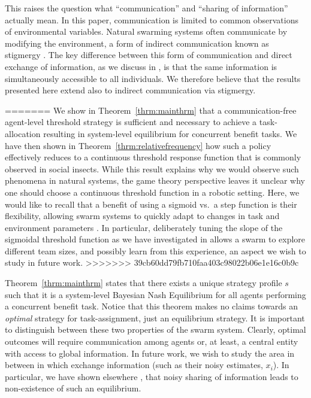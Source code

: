 \documentclass[conference]{ieeeconf}
\begin{document}
This raises the question what ``communication'' and ``sharing of information'' actually mean. In this paper, communication is limited to common observations of environmental variables. Natural swarming systems often communicate by modifying the environment, a form of indirect communication known as stigmergy \cite{grasse1959reconstruction}. The key difference between this form of communication and direct exchange of information, as we discuss in \cite{Touri2014}, is that the same information is simultaneously accessible to all individuals. We therefore believe that the results presented here extend also to indirect communication via stigmergy.

=======
We show in Theorem~\ref{thrm:mainthrm} that a communication-free agent-level threshold strategy is sufficient and necessary to achieve a task-allocation resulting in system-level equilibrium for concurrent benefit tasks. We have then shown in Theorem~\ref{thrm:relativefrequency} how such a policy effectively reduces to a continuous threshold response function that is commonly observed in social insects. While this result explains why we would observe such phenomena in natural systems, the game theory perspective leaves it unclear why one should choose a continuous threshold function in a robotic setting. Here, we would like to recall that a benefit of using a sigmoid vs.\ a step function is their flexibility, allowing swarm systems to quickly adapt to changes in task and environment parameters \cite{Bonabeau1997}. In particular, deliberately tuning the slope of the sigmoidal threshold function as we have investigated in \cite{Kanakia2014} allows a swarm to explore different team sizes, and possibly learn from this experience, an aspect we wish to study in future work. 
>>>>>>> 39cb60dd79fb710faa403c98022b06e1e16c0b9c

Theorem~\ref{thrm:mainthrm} states that there exists a unique strategy profile $s$ such that it is a system-level Bayesian Nash Equilibrium for all agents performing a concurrent benefit task. Notice that this theorem makes no claims towards an \emph{optimal} strategy for task-assignment, just an equilibrium strategy. It is important to distinguish between these two properties of the swarm system. Clearly, optimal outcomes will require communication among agents or, at least, a central entity with access to global information. In future work, we wish to study the area in between in which exchange information (such as their noisy estimates, $x_i$). In particular, we have shown elsewhere \cite{Touri2014}, that noisy sharing of information leads to non-existence of such an equilibrium.
\end{document}
